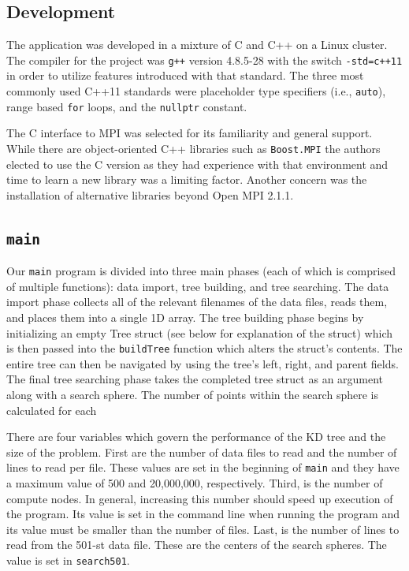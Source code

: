 \documentclass{article}
\begin{document}
%
%

\subsection{Development}

The application was developed in a mixture of C and C++ on a Linux cluster. The compiler for the project was \texttt{g++} version 4.8.5-28 with the switch \texttt{-std=c++11} in order to utilize features introduced with that standard. The three most commonly used C++11 standards were placeholder type specifiers (i.e., \texttt{auto}), range based \texttt{for} loops, and the \texttt{nullptr} constant.

The C interface to MPI was selected for its familiarity and general support. While there are object-oriented C++ libraries such as \texttt{Boost.MPI} the authors elected to use the C version as they had experience with that environment and time to learn a new library was a limiting factor. Another concern was the installation of alternative libraries beyond Open MPI 2.1.1.


%
%

\subsection{\texttt{main}}
Our \texttt{main} program is divided into three main phases (each of which is comprised of multiple functions): data import, tree building, and tree searching. The data import phase collects all of the relevant filenames of the data files, reads them, and places them into a single 1D array. The tree building phase begins by initializing an empty Tree struct (see below for explanation of the struct) which is then passed into the \texttt{buildTree} function which alters the struct's contents. The entire tree can then be navigated by using the tree's left, right, and parent fields. The final tree searching phase takes the completed tree struct as an argument along with a search sphere. The number of points within the search sphere is calculated for each

There are four variables which govern the performance of the KD tree and the size of the problem. First are the number of data files to read and the number of lines to read per file. These values are set in the beginning of \texttt{main} and they have a maximum value of 500 and 20,000,000, respectively. Third, is the number of compute nodes. In general, increasing this number should speed up execution of the program. Its value is set in the command line when running the program and its value must be smaller than the number of files. Last, is the number of lines to read from the 501-st data file. These are the centers of the search spheres. The value is set in \texttt{search501}.
\end{document}

